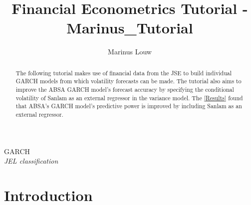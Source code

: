 \documentclass[11pt,preprint, authoryear]{elsarticle}
\numberwithin{equation}{section}
\numberwithin{figure}{section}
\numberwithin{table}{section}
\begin{document}
\begin{frontmatter}  %

\title{Financial Econometrics Tutorial - Marinus\_Tutorial}





\author[Add1]{Marinus Louw}





\address[Add1]{Financial Economtrics Course, Stellenbosch University, South Africa}


\begin{abstract}
\small{
The following tutorial makes use of financial data from the JSE to build
individual GARCH models from which volatility forecasts can be made. The
tutorial also aims to improve the ABSA GARCH model's forecast accuracy
by specifying the conditional volatility of Sanlam as an external
regressor in the variance model. The \ref{Results} found that ABSA's
GARCH model's predictive power is improved by including Sanlam as an
external regressor.
}
\end{abstract}

\vspace{1cm}

\begin{keyword}
\footnotesize{
GARCH \\ \vspace{0.3cm}
\textit{JEL classification} 
}
\end{keyword}
\vspace{0.5cm}
\end{frontmatter}



\pagestyle{fancy}
\chead{}
\rhead{}
\lfoot{}
\lhead{}
\cfoot{}


\headsep 35pt %




\section{\texorpdfstring{Introduction
\label{Introduction}}{Introduction }}\label{introduction}
\end{document}
